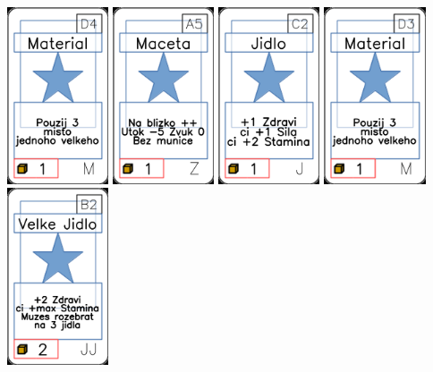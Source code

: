 \documentclass[a4paper]{article}
\begin{document}
	\includegraphics[width=3.0cm]{img-1_48}
	\includegraphics[width=3.0cm]{img-1_94}
	\includegraphics[width=3.0cm]{img-1_11}
	\includegraphics[width=3.0cm]{img-1_47}
	\includegraphics[width=3.0cm]{img-1_36}
\end{document}
